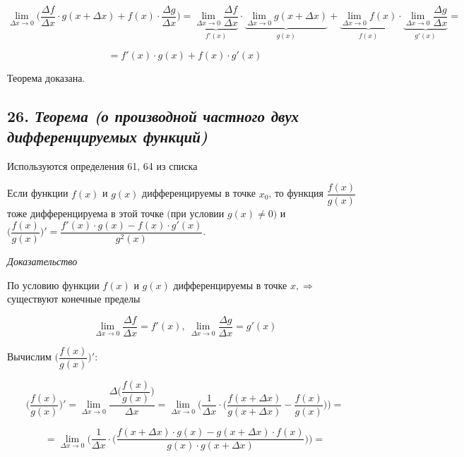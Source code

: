 $$
\lim\limits_{\Delta x \rightarrow 0}\bigg(\dfrac{\Delta f}{\Delta x}\cdot g(x + \Delta x) + f(x)\cdot \dfrac{\Delta g}{\Delta x}\bigg)
=\underbrace{\lim\limits_{\Delta x \rightarrow 0}\dfrac{\Delta f}{\Delta x}}_{f'(x)}\cdot \underbrace{\lim\limits_{\Delta x \rightarrow 0}g(x + \Delta x)}_{g(x)} + \underbrace{\lim\limits_{\Delta x \rightarrow 0}f(x)}_{f(x)}\cdot \underbrace{\lim\limits_{\Delta x \rightarrow 0}\dfrac{\Delta g}{\Delta x}}_{g'(x)}=
$$

$$ = f'(x)\cdot g(x) + f(x)\cdot g'(x) $$

Теорема доказана.
\newpage 
\subsection*{26. \textit{Теорема (о производной частного двух дифференцируемых функций)}}
\begin{Quote2} 
\small\centering 

Используются определения 61, 64 из списка \end{Quote2} 

Если функции $f(x)$ и $g(x)$ дифференцируемы в точке $x_0$, то функция ${\dfrac{f(x)}{g(x)}}$ тоже дифференцируема в этой точке $\big($при условии $g(x) \neq 0\big)$ и $\bigg({\dfrac{f(x)}{g(x)}}\bigg)' = {\dfrac{f'(x)\cdot g(x) - f(x)\cdot g'(x)}{g^2(x)}}.$
\vspace*{20pt} 

\textit{Доказательство}

По условию функции $f(x)$ и $g(x)$ дифференцируемы в точке $x, \Rightarrow$ существуют конечные пределы

$$
\lim\limits_{\Delta x \rightarrow 0}\dfrac{\Delta f}{\Delta x} = f'(x), \ \lim\limits_{\Delta x \rightarrow 0}\dfrac{\Delta g}{\Delta x} = g'(x)
$$

Вычислим $\bigg({\dfrac{f(x)}{g(x)}}\bigg)'$:

$$
\bigg({\dfrac{f(x)}{g(x)}}\bigg)' = \lim\limits_{\Delta x \rightarrow 0} {\dfrac{\Delta\bigg({\dfrac{f(x)}{g(x)}}\bigg)}{\Delta x}}
= \lim\limits_{\Delta x \rightarrow 0}\Bigg( \dfrac{1}{\Delta x}\cdot\bigg({\dfrac{f(x + \Delta x)}{g(x + \Delta x)}}-{\dfrac{f(x)}{g(x)}}\bigg)\Bigg) 
=
$$

$$
=\lim\limits_{\Delta x \rightarrow 0}\Bigg( \dfrac{1}{\Delta x}\cdot\bigg({\dfrac{f(x + \Delta x)\cdot g(x)-g(x + \Delta x)\cdot f(x)}{g(x)\cdot g(x + \Delta x)}}\bigg)\Bigg) =
$$

